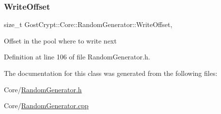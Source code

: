 \subsubsection{\texorpdfstring{Write\+Offset}{WriteOffset}}
{\footnotesize\ttfamily size\+\_\+t Gost\+Crypt\+::\+Core\+::\+Random\+Generator\+::\+Write\+Offset\hspace{0.3cm}{\ttfamily [static]}, {\ttfamily [protected]}}

Offset in the pool where to write next 

Definition at line 106 of file Random\+Generator.\+h.



The documentation for this class was generated from the following files\+:\begin{DoxyCompactItemize}
\item 
Core/\hyperlink{_random_generator_8h}{Random\+Generator.\+h}\item 
Core/\hyperlink{_random_generator_8cpp}{Random\+Generator.\+cpp}\end{DoxyCompactItemize}
